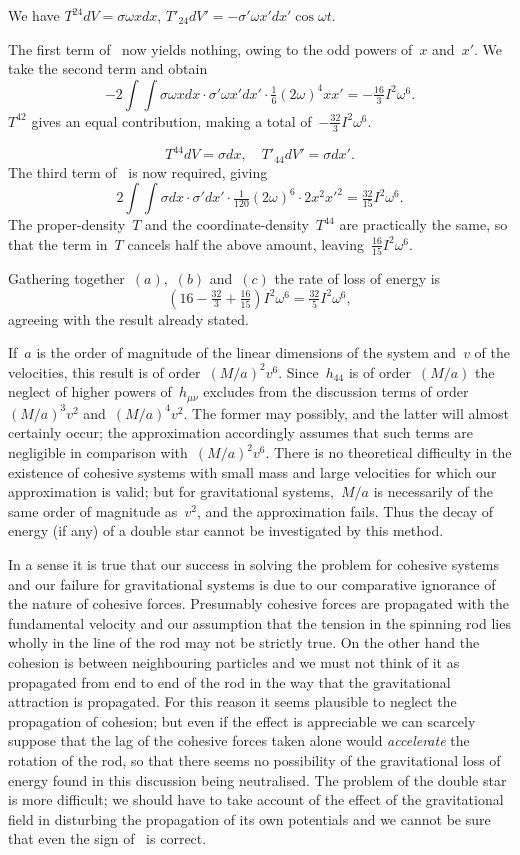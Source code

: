 \documentclass[12pt]{book}
\begin{document}
We have $T^{24}dV = \sigma\omega x dx$, $T'_{24}dV' = -\sigma'\omega x' dx' \cos\omega t$.

The first term of~ now yields nothing, owing to the odd powers of~$x$ and~$x'$.
We take the second term and obtain
\[
-2\int\int\sigma\omega x dx \cdot \sigma'\omega x' dx'\cdot\tfrac{1}{6} (2\omega)^4 x x' = -\tfrac{16}{3}I^2\omega^6.
\]
$T^{42}$ gives an equal contribution, making a total of~$-\tfrac{32}{3}I^2\omega^6$.

\[
T^{44} dV = \sigma dx, \quad T'_{44} dV' = \sigma dx'.
\]
The third term of~ is now required, giving
\[
2\int\int\sigma dx\cdot\sigma' dx' \cdot\tfrac{1}{120}(2\omega)^6\cdot 2 x^2 x'^2 = \tfrac{32}{15}I^2\omega^6.
\]
The proper\hyp{}density~$T$ and the coordinate\hyp{}density~$T^{44}$ are practically the same, so that the term in~$T$
cancels half the above amount, leaving~$\tfrac{16}{15}I^2\omega^6$.

Gathering together~$(a)$,~$(b)$ and~$(c)$ the rate of loss of energy is
\[
(16-\tfrac{32}{3}+\tfrac{16}{15})I^2\omega^6=\tfrac{32}{5}I^2\omega^6,
\]
agreeing with the result already stated.

If~$a$ is the order of magnitude of the linear dimensions of the system and~$v$ of the velocities,
this result is of order~$(M/a)^2 v^6$.
Since~$h_{44}$ is of order~$(M/a)$ the neglect of higher powers of~$h_{\mu\nu}$ excludes from the discussion terms
of order~$(M/a)^3 v^2$ and~$(M/a)^4 v^2$.
The former may possibly, and the latter will almost certainly occur;
the approximation accordingly assumes that such terms are negligible in comparison with~$(M/a)^2 v^6$.
There is no theoretical difficulty in the existence of cohesive systems with small mass and large velocities
for which our approximation is valid; but for gravitational systems,~$M/a$ is necessarily of the same order
of magnitude as~$v^2$, and the approximation fails.
Thus the decay of energy (if any) of a double star cannot be investigated by this method.

In a sense it is true that our success in solving the problem for cohesive systems and our failure for
gravitational systems is due to our comparative ignorance of the nature of cohesive forces.
Presumably cohesive forces are propagated with the fundamental velocity and our assumption that the tension
in the spinning rod lies wholly in the line of the rod may not be strictly true.
On the other hand the cohesion is between neighbouring particles and we must not think of it as propagated
from end to end of the rod in the way that the gravitational attraction is propagated.
For this reason it seems plausible to neglect the propagation of cohesion; but even if the effect is
appreciable we can scarcely suppose that the lag of the cohesive forces taken alone would \emph{accelerate}
the rotation of the rod, so that there seems no possibility of the gravitational loss of energy found in this
discussion being neutralised.
The problem of the double star is more difficult; we should have to take account of the effect of the
gravitational field in disturbing the propagation of its own potentials and we cannot be sure that even the
sign of~ is correct.
\end{document}
